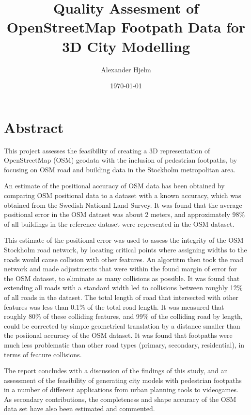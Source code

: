 \documentclass[a4paper]{article}
\title{Quality Assesment of OpenStreetMap Footpath Data for 3D City Modelling}
\author{Alexander Hjelm}
\date{\today}
\begin{document}
\maketitle

\section{Abstract}

This project assesses the feasibility of creating a 3D representation of OpenStreetMap (OSM) geodata with the inclusion of pedestrian footpaths, by focusing on OSM road and building data in the Stockholm metropolitan area.

An estimate of the positional accuracy of OSM data has been obtained by comparing OSM positional data to a dataset with a known accuracy, which was obtained from the Swedish National Land Survey.
It was found that the average positional error in the OSM dataset was about 2 meters, and approximately 98\% of all buildings in the reference dataset were represented in the OSM dataset.

This estimate of the positional error was used to assess the integrity of the OSM Stockholm road network, by locating critical points where assigning widths to the roads would cause collision with other features.
An algortitm then took the road network and made adjustments that were within the found margin of error for the OSM dataset, to eliminate as many collisions as possible.
It was found that extending all roads with a standard width led to collisions between roughly 12\% of all roads in the dataset.
The total length of road that intersected with other features was less than 0.1\% of the total road length.
It was measured that roughly 80\% of these colliding features, and 99\% of the colliding road by length, could be corrected by simple geometrical translation by a distance smaller than the posiional accuracy of the OSM dataset.
It was found that footpaths were much less problematic than other road types (primary, secondary, residential), in terms of feature collisions.

The report concludes with a discussion of the findings of this study, and an assessment of the feasibility of generating city models with pedestrian footpaths in a number of different applications from urban planning tools to videogames.
As secondary contributions, the completeness and shape accuracy of the OSM data set have also been estimated and commented.

\newpage
\tableofcontents
\newpage
\end{document}
